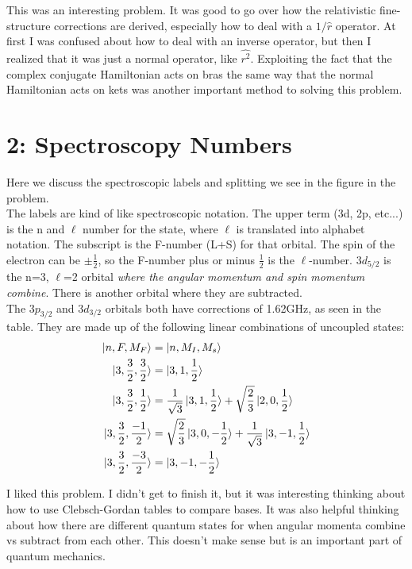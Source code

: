 \documentclass[10pt]{article} %
\begin{document}
This was an interesting problem. It was good to go over how the relativistic fine-
structure corrections are derived, especially how to deal with a $1/\hat{r}$
operator. At first I was confused about how to deal with an inverse operator, but
then I realized that it was just a normal operator, like $\hat{r^2}$. Exploiting
the fact that the complex conjugate Hamiltonian acts on bras the same way that the
normal Hamiltonian acts on kets was another important method to solving this problem.\\


\section{2: Spectroscopy Numbers}
Here we discuss the spectroscopic labels and splitting we see in the figure in the
problem.\\

The labels are kind of like spectroscopic notation. The upper term (3d, 2p, etc...) is
the n and $\ell$ number for the state, where $\ell$ is translated into alphabet
notation. The subscript is the F-number (L+S) for that orbital. The spin of the electron can be
$\pm\frac{1}{2}$, so the F-number plus or minus $\frac{1}{2}$ is the $\ell$-number. $3d_{5/2}$ is
the n=3, $\ell$=2 orbital \textit{where the angular momentum and spin momentum combine}. There is
another orbital where they are subtracted.\\

The $3p_{3/2}$ and $3d_{3/2}$ orbitals both have corrections of 1.62GHz, as seen in the table. They
are made up of the following linear combinations of uncoupled states:\\

\begin{align*}
  \ket{n,F,M_F} &= \ket{n,M_I,M_s}\\
  \ket{3,\frac{3}{2}, \frac{ 3}{2}} &= \ket{3,1,\frac{1}{2}}\\
  \ket{3,\frac{3}{2}, \frac{ 1}{2}} &= \frac{1}{\sqrt{3}}\ket{3,1,\frac{1}{2}}
  + \sqrt{\frac{2}{3}}\ket{2,0,\frac{1}{2}}\\
  \ket{3,\frac{3}{2}, \frac{-1}{2}} &= \sqrt{\frac{2}{3}}\ket{3,0,-\frac{1}{2}}
  + \frac{1}{\sqrt{3}}\ket{3,-1,\frac{1}{2}}\\
  \ket{3,\frac{3}{2}, \frac{-3}{2}} &= \ket{3,-1,-\frac{1}{2}}\\
\end{align*}

I liked this problem. I didn't get to finish it, but it was interesting thinking about how to use
Clebsch-Gordan tables to compare bases. It was also helpful thinking about how there are different
quantum states for when angular momenta combine vs subtract from each other. This doesn't make
sense but is an important part of quantum mechanics.\\
\end{document}
